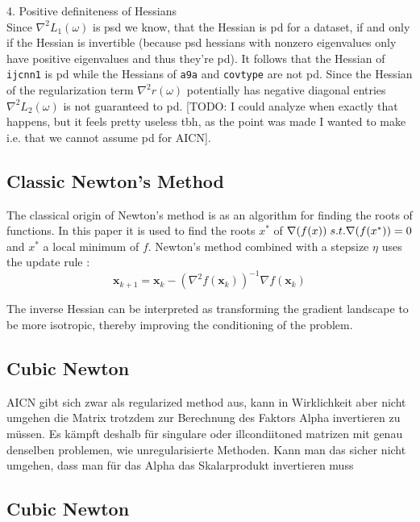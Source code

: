 \documentclass{article}
\begin{document}
4. Positive definiteness of Hessians\\
Since $\nabla^2 L_1(\omega)$ is psd we know, that the Hessian is pd for a dataset, if and only if the Hessian is invertible (because psd hessians with nonzero eigenvalues only have positive eigenvalues and thus they're pd). It follows that the Hessian of \texttt{ijcnn1} is pd while the Hessians of \texttt{a9a} and \texttt{covtype} are not pd. Since the Hessian of the regularization term $\nabla ^2 r(\omega)$ potentially has negative diagonal entries $\nabla^2 L_2(\omega)$ is not guaranteed to pd. [TODO: I could analyze when exactly that happens, but it feels pretty useless tbh, as the point was made I wanted to make i.e. that we cannot assume pd for AICN].




\subsection{Classic Newton's Method}

The classical origin of Newton's method is as an algorithm for finding the roots of functions. In this paper it is used to find the roots $x^{*}$ of $\nabla (f(x)) \hspace{0.1cm} s.t.\nabla(f(x^{*})) = 0$ and $x^{*}$ a local minimum of $f$. Newton's method combined with a stepsize $\eta$ uses the update rule \cite{wright}:
\begin{equation}
  \mathbf{x}_{k+1} = \mathbf{x}_k - (\nabla^2 f(\mathbf{x}_k))^{-1} \nabla f(\mathbf{x}_k)
\end{equation}

The inverse Hessian can be interpreted as transforming the gradient landscape to be more isotropic, thereby improving the conditioning of the problem. 
\subsection{Cubic Newton}
AICN gibt sich zwar als regularized method aus, kann in Wirklichkeit aber nicht umgehen die Matrix trotzdem zur Berechnung des Faktors Alpha invertieren zu müssen. Es kämpft deshalb für singulare oder illcondiitoned matrizen mit genau denselben problemen, wie unregularisierte Methoden. Kann man das sicher nicht umgehen, dass man für das Alpha das Skalarprodukt invertieren muss
\subsection{Cubic Newton}
\end{document}
